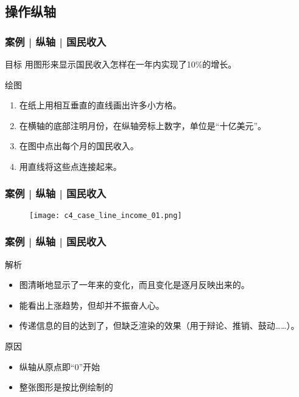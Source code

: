 \subsection{操作纵轴}
\begin{frame}
  \frametitle{案例 | 纵轴 | 国民收入}
  \begin{block}{目标}
    用图形来显示国民收入怎样在一年内实现了10\%的增长。
  \end{block}
  \pause
  \begin{block}{绘图}
    \begin{enumerate}
      \item 在纸上用相互垂直的直线画出许多小方格。
      \item 在横轴的底部注明月份，在纵轴旁标上数字，单位是“十亿美元”。
      \item 在图中点出每个月的国民收入。
      \item 用直线将这些点连接起来。
    \end{enumerate}
  \end{block}
\end{frame}

\begin{frame}
  \frametitle{案例 | 纵轴 | 国民收入}
  \begin{figure}
    \centering
    \texttt{[image: c4\_case\_line\_income\_01.png]}
  \end{figure}
\end{frame}

\begin{frame}
  \frametitle{案例 | 纵轴 | 国民收入}
  \begin{block}{解析}
    \begin{itemize}
      \item 图清晰地显示了一年来的变化，而且变化是逐月反映出来的。
      \item 能看出上涨趋势，但却并不振奋人心。
      \item 传递信息的目的达到了，但缺乏渲染的效果（用于辩论、推销、鼓动……）。
    \end{itemize}
  \end{block}
  \pause
  \begin{block}{原因}
    \begin{itemize}
      \item 纵轴从原点即“0”开始
      \item 整张图形是按比例绘制的
    \end{itemize}
  \end{block}
\end{frame}

